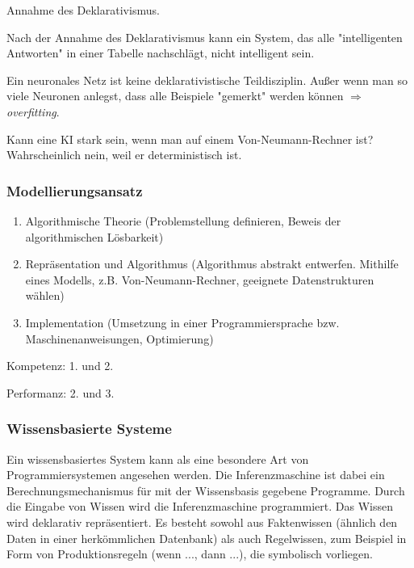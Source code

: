 \documentclass[runningheads]{llncs}
\begin{document}
\begin{definition}{Annahme des Deklarativismus.}

    Nach der Annahme des Deklarativismus kann ein System, das alle "intelligenten Antworten" in einer Tabelle nachschlägt, nicht intelligent sein.
\end{definition}

\begin{remark}
    Ein neuronales Netz ist keine deklarativistische Teildisziplin. Außer wenn man so viele Neuronen anlegst, dass alle Beispiele "gemerkt" werden können $\Rightarrow$ \textit{overfitting}.  
\end{remark}


\begin{remark}{Kann eine KI stark sein, wenn man auf einem Von-Neumann-Rechner ist?}
    Wahrscheinlich nein, weil er deterministisch ist.
\end{remark}

\subsubsection{Modellierungsansatz}

\begin{enumerate}
    \item Algorithmische Theorie (Problemstellung definieren, Beweis der algorithmischen Lösbarkeit)

    \item Repräsentation und Algorithmus (Algorithmus abstrakt entwerfen. Mithilfe eines Modells, z.B. Von-Neumann-Rechner, geeignete Datenstrukturen wählen)

    \item Implementation (Umsetzung in einer Programmiersprache bzw. Maschinenanweisungen, Optimierung)
\end{enumerate}

Kompetenz: 1. und 2.

Performanz: 2. und 3.

\subsubsection{Wissensbasierte Systeme}

Ein wissensbasiertes System kann als eine besondere Art von Programmiersystemen angesehen werden. Die Inferenzmaschine ist dabei ein Berechnungsmechanismus für mit der Wissensbasis gegebene Programme. Durch die Eingabe von Wissen wird die Inferenzmaschine programmiert. Das Wissen wird deklarativ repräsentiert. Es besteht sowohl aus Faktenwissen (ähnlich den Daten in einer herkömmlichen Datenbank) als auch Regelwissen, zum Beispiel in Form von Produktionsregeln (wenn ..., dann ...), die symbolisch vorliegen. 
\end{document}
